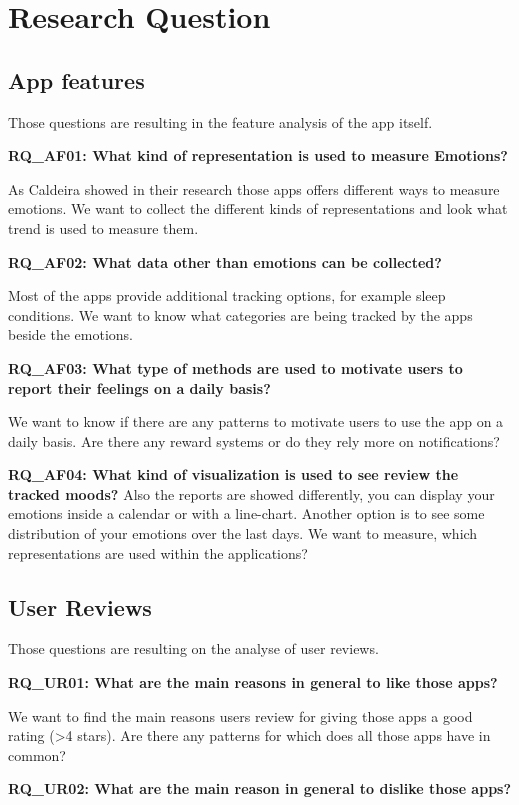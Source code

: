 \chapter{Research Question}
\section{App features}
Those questions are resulting in the feature analysis of the app itself.

\textbf{RQ\_AF01: What kind of representation is used to measure Emotions?}

As Caldeira showed in their research those apps offers different ways to measure emotions\cite{caldeira_mobile_nodate}.
We want to collect the different kinds of representations and look what trend is used to measure them.


\textbf{RQ\_AF02: What data other than emotions can be collected?}

Most of the apps provide additional tracking options, for example sleep conditions.
We want to know what categories are being tracked by the apps beside the emotions.

\textbf{RQ\_AF03: What type of methods are used to motivate users to report their feelings on a daily basis?}

We want to know if there are any patterns to motivate users to use the app on a daily basis.
Are there any reward systems or do they rely more on notifications? 

\textbf{RQ\_AF04: What kind of visualization is used to see review the tracked moods?}
Also the reports are showed differently, you can display your emotions inside a calendar or with a line-chart.
Another option is to see some distribution of your emotions over the last days.
We want to measure, which representations are used within the applications?

\section{User Reviews}
Those questions are resulting on the analyse of user reviews.

\textbf{RQ\_UR01: What are the main reasons in general to like those apps?}

We want to find the main reasons users review for giving those apps a good rating (>4 stars).
Are there any patterns for which does all those apps have in common?

\textbf{RQ\_UR02: What are the main reason in general to dislike those apps?}

